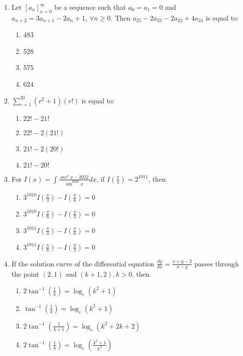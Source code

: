 \documentclass[journal]{IEEEtran}
\newcommand{\brak}[1]{\left( #1 \right)}
\newcommand{\sbrak}[1]{\left[ #1 \right]}
\newcommand{\gt}{>}
\begin{document}
\begin{enumerate}
    \item Let $\sbrak{a_{n}}_{n=0}^{\infty}$ be a sequence such that $a_{0}=a_{1}=0$ and $a_{n+2}=3a_{n+1}-2a_{n}+1$, $\forall n\geq0$. Then $a_{25}-2a_{23}-2a_{22}+4a_{24}$ is equal to:

        \begin{multicols}{4}
        \begin{enumerate}
        \item 483
        \item 528
        \item 575
        \item 624
        \end{enumerate}
        \end{multicols}

    \item $\sum_{r=1}^{20}\brak{r^{2}+1}\brak{r!}$ is equal to:

        \begin{multicols}{4}
        \begin{enumerate}
        \item $22!-21!$
        \item $22!-2\brak{21!}$
        \item $21!-2\brak{20!}$
        \item $21!-20!$
        \end{enumerate}
        \end{multicols}

    \item For $I\brak{x}=\int\frac{\sec^{2}x-2022}{\sin^{2022}x}dx$, if $I\brak{\frac{\pi}{4}}=2^{1011}$, then

        \begin{enumerate}
        \item $3^{1010}I\brak{\frac{\pi}{3}}-I\brak{\frac{\pi}{6}}=0$
        \item $3^{1010}I\brak{\frac{\pi}{6}}-I\brak{\frac{\pi}{3}}=0$
        \item $3^{1011}I\brak{\frac{\pi}{3}}-I\brak{\frac{\pi}{6}}=0$
        \item $3^{1011}I\brak{\frac{\pi}{6}}-I\brak{\frac{\pi}{3}}=0$
        \end{enumerate}
      
    \item If the solution curve of the differential equation $\frac{dy}{dx}=\frac{x+y-2}{x-y}$ passes through the point $\brak{2,1}$ and $\brak{k+1,2},k\gt0$, then

        \begin{enumerate}
        \item $2\tan^{-1}\brak{\frac{1}{k}}=\log_{e}\brak{k^{2}+1}$
        \item $\tan^{-1}\brak{\frac{1}{k}}=\log_{e}\brak{k^{2}+1}$
        \item $2\tan^{-1}\brak{\frac{1}{k+1}}=\log_{e}\brak{k^{2}+2k+2}$
        \item $2\tan^{-1}\brak{\frac{1}{k}}=\log_{e}\brak{\frac{k^{2}+1}{k^{2}}}$
        \end{enumerate}


\end{enumerate}
\end{document}

